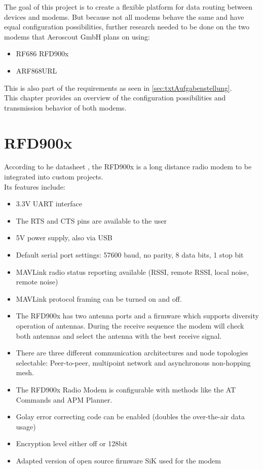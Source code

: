 %
The goal of this project is to create a flexible platform for data routing between devices and modems. But because not all modems behave the same and have equal configuration possibilities, further research needed to be done on the two modems that Aeroscout GmbH plans on using:
\begin{itemize}
    \item RF686 RFD900x
    \item ARF868URL
\end{itemize}
This is also part of the requirements as seen in \autoref{sec:txtAufgabenstellung}.\\
This chapter provides an overview of the configuration possibilities and transmission behavior of both modems.
%
%
%
%
\section{RFD900x}%
According to he datasheet \cite{RFD900x_Datasheet}, the RFD900x is a long distance radio modem to be integrated into custom projects.\\
Its features include: \begin{itemize}
    \item 3.3V UART interface
    \item The RTS and CTS pins are available to the user
    \item 5V power supply, also via USB
    \item Default serial port settings: 57600 baud, no parity, 8 data bits, 1 stop bit
    \item MAVLink radio status reporting available (RSSI, remote RSSI, local noise, remote noise)
    \item MAVLink protocol framing can be turned on and off.
    \item The RFD900x has two antenna ports and a firmware which supports diversity operation of antennas. During the receive sequence the modem will check both antennas and select the antenna with the best receive signal.
    \item There are three different communication architectures and node topologies selectable: Peer-to-peer, multipoint network and asynchronous non-hopping mesh.
    \item The RFD900x Radio Modem is configurable with methods like the AT Commands and APM Planner.
    \item Golay error correcting code can be enabled (doubles the over-the-air data usage)
    \item Encryption level either off or 128bit 
    \item Adapted version of open source firmware SiK used for the modem
\end{itemize}
%
%
